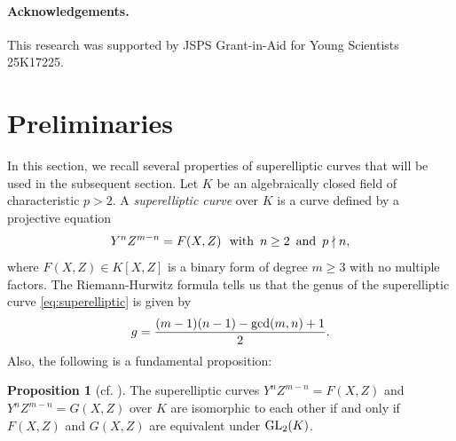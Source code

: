 \documentclass{article}
\theoremstyle{definition}
\newtheorem{Prop}[Def]{Proposition}
\begin{document}
\paragraph{Acknowledgements.} This research was supported by JSPS Grant-in-Aid for Young Scientists 25K17225.

\newpage
\section{Preliminaries}\label{sec:preliminaries}
In this section, we recall several properties of superelliptic curves that will be used in the subsequent section.
Let $K$ be an algebraically closed field of characteristic $p > 2$.
A \emph{superelliptic curve} over $K$ is a curve defined by a projective equation\vspace{-0.7mm}
\begin{equation}\label{eq:superelliptic}
    Y^nZ^{m-n} = F(X,Z)\ \text{ with }\,n \hspace{-0.1mm}\geq 2 \,\text{ and }\, p \nmid n,\vspace{0.4mm}
\end{equation}
where $F(X,Z) \in K[X,Z]$ is a binary form of degree $m \geq 3$ with no multiple factors.
The Riemann-Hurwitz formula tells us that the genus of the superelliptic curve \eqref{eq:superelliptic} is given by\vspace{-1.2mm}
\[
    g = \frac{(m-1)(n-1)-{\rm gcd}(m,n)+1}{2}.
\]
Also, the following is a fundamental proposition:\vspace{-1.2mm}
\begin{Prop}[{cf. \cite[Section 8]{MS}}]\label{prop:isomorphic}
The superelliptic curves $Y^nZ^{m-n} = F(X,Z)$ and $Y^nZ^{m-n} = G(X,Z)$ over $K$ are isomorphic to each other if and only if $F(X,Z)$ and $G(X,Z)$ are equivalent under ${\rm GL}_2(K)$.
\end{Prop}
\end{document}

